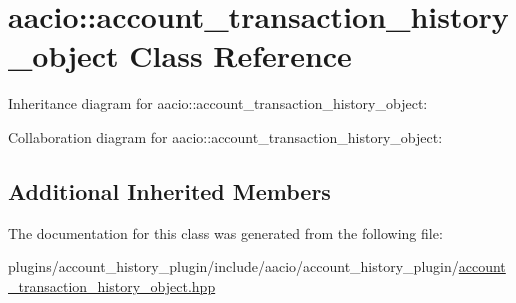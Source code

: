 \hypertarget{classaacio_1_1account__transaction__history__object}{}\section{aacio\+:\+:account\+\_\+transaction\+\_\+history\+\_\+object Class Reference}
\label{classaacio_1_1account__transaction__history__object}


Inheritance diagram for aacio\+:\+:account\+\_\+transaction\+\_\+history\+\_\+object\+:


Collaboration diagram for aacio\+:\+:account\+\_\+transaction\+\_\+history\+\_\+object\+:
\subsection*{Additional Inherited Members}


The documentation for this class was generated from the following file\+:\begin{DoxyCompactItemize}
\item 
plugins/account\+\_\+history\+\_\+plugin/include/aacio/account\+\_\+history\+\_\+plugin/\mbox{\hyperlink{account__transaction__history__object_8hpp}{account\+\_\+transaction\+\_\+history\+\_\+object.\+hpp}}\end{DoxyCompactItemize}
